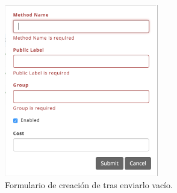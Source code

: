 \begin{figure}[H]
	\centering
	\includegraphics[width=0.6\textwidth]{figuras/dashboard/shipping/form_shipping_add_send_empty.png}
	\caption{Formulario de creación de \shippingEF tras enviarlo vacío.}
	\label{figure:apendice:dashboard:shipping:form_shipping_add_send_empty}
\end{figure}